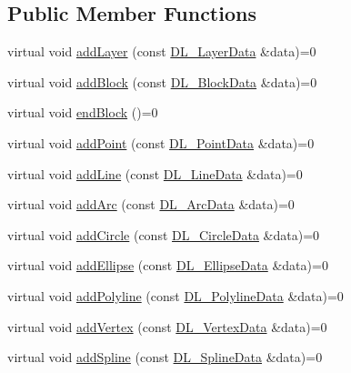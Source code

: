 \subsection*{Public Member Functions}
\begin{DoxyCompactItemize}
\item 
virtual void \hyperlink{classDL__CreationInterface_a97e5706d9dde3cdbc06e34971828172b}{add\-Layer} (const \hyperlink{structDL__LayerData}{D\-L\-\_\-\-Layer\-Data} \&data)=0
\item 
virtual void \hyperlink{classDL__CreationInterface_a058791e7dccf4511e09ea2d292ea728d}{add\-Block} (const \hyperlink{structDL__BlockData}{D\-L\-\_\-\-Block\-Data} \&data)=0
\item 
virtual void \hyperlink{classDL__CreationInterface_a9dfba582bfa5bfb1de7664740a54ff11}{end\-Block} ()=0
\item 
virtual void \hyperlink{classDL__CreationInterface_a446f8a07c16455bd13313e256ae10fe9}{add\-Point} (const \hyperlink{structDL__PointData}{D\-L\-\_\-\-Point\-Data} \&data)=0
\item 
virtual void \hyperlink{classDL__CreationInterface_a810493ceadcf1a1f58d297da9b94bbcd}{add\-Line} (const \hyperlink{structDL__LineData}{D\-L\-\_\-\-Line\-Data} \&data)=0
\item 
virtual void \hyperlink{classDL__CreationInterface_a67f4f086b530c93ece8d5c2591213517}{add\-Arc} (const \hyperlink{structDL__ArcData}{D\-L\-\_\-\-Arc\-Data} \&data)=0
\item 
virtual void \hyperlink{classDL__CreationInterface_ada8ad9e8697df6411defb4b5d2130bd6}{add\-Circle} (const \hyperlink{structDL__CircleData}{D\-L\-\_\-\-Circle\-Data} \&data)=0
\item 
virtual void \hyperlink{classDL__CreationInterface_a0e3c23fe83bf6a0dbbf61d41f850f595}{add\-Ellipse} (const \hyperlink{structDL__EllipseData}{D\-L\-\_\-\-Ellipse\-Data} \&data)=0
\item 
virtual void \hyperlink{classDL__CreationInterface_af7798457fb69284ab8fe6f2036030a8b}{add\-Polyline} (const \hyperlink{structDL__PolylineData}{D\-L\-\_\-\-Polyline\-Data} \&data)=0
\item 
virtual void \hyperlink{classDL__CreationInterface_a27ff9e33de99ac82ed93f0dba38cd496}{add\-Vertex} (const \hyperlink{structDL__VertexData}{D\-L\-\_\-\-Vertex\-Data} \&data)=0
\item 
virtual void \hyperlink{classDL__CreationInterface_ae1b7d461b9b3a474570b2251a89a4461}{add\-Spline} (const \hyperlink{structDL__SplineData}{D\-L\-\_\-\-Spline\-Data} \&data)=0

\end{DoxyCompactItemize}
